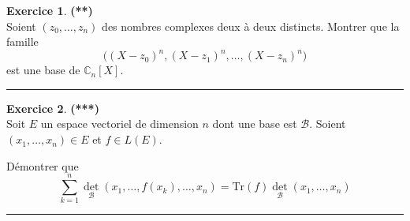 \documentclass[a4paper,11pt]{article}
\theoremstyle{definition}
\newtheorem{exo}{Exercice} %
\begin{document}
\begin{minipage}{1\linewidth}
\begin{minipage}[c]{0.48\linewidth}
\end{minipage}\hfill\vrule\hfill\begin{minipage}[c]{0.48\linewidth}\raggedright

\begin{exo}\textbf{(**)}\quad\\[0.2cm]
	Soient $(z_0,\dots,z_{n})$ des nombres complexes deux à deux distincts. Montrer que la famille
	$$\big( (X-z_0)^n,(X-z_1)^n,\dots,(X-z_n)^n\big)$$
	est une base de $\mathbb C_n[X]$.
	
	\centering\rule{1\linewidth}{0.6pt}\end{exo}


\begin{exo}\textbf{(***)}\quad\\[0.2cm]
	Soit $E$ un espace vectoriel de dimension $n$ dont une base est $\mathcal{B}$. Soient $(x_{1},\ldots,x_{n})\in E$ et $f\in L(E)$. 
	
	Démontrer que $$\displaystyle\sum_{k=1}^{n}\det_{\mathcal{B}}(x_{1},\ldots,f(x_{k}),\ldots,x_{n})=\textrm{Tr}(f)\det_{\mathcal{B}}(x_{1},\dots,x_{n})$$
	
	\centering\rule{1\linewidth}{0.6pt}\end{exo}


\end{minipage}\end{minipage}


\newpage
\end{document}
